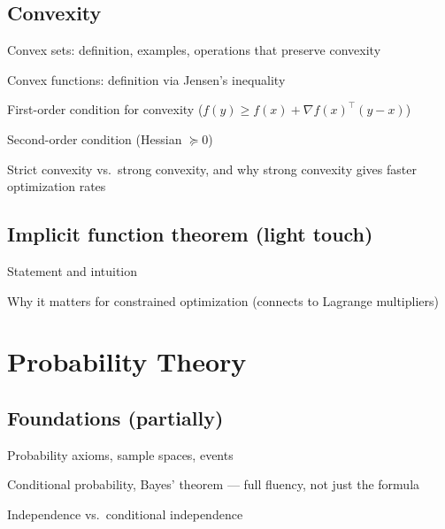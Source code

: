 \subsection{Convexity}
\begin{tasklist}
    \item Convex sets: definition, examples, operations that preserve convexity
    \item Convex functions: definition via Jensen's inequality
    \item First-order condition for convexity ($f(y) \ge f(x) + \nabla f(x)^\top (y-x)$)
    \item Second-order condition (Hessian $\succeq 0$)
    \item Strict convexity vs.\ strong convexity, and why strong convexity gives faster optimization rates
\end{tasklist}

\subsection{Implicit function theorem (light touch)}
\begin{tasklist}
    \item Statement and intuition
    \item Why it matters for constrained optimization (connects to Lagrange multipliers)
\end{tasklist}

\section{Probability Theory}

\subsection{Foundations \review (partially)}
\begin{tasklist}
    \item Probability axioms, sample spaces, events
    \item Conditional probability, Bayes' theorem — full fluency, not just the formula
    \item Independence vs.\ conditional independence
\end{tasklist}

